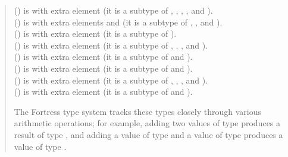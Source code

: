 \begin{description}
\begin{quote}
\begin{tabbing}
 () is  with extra element \EXP{+\infty}
(it is a subtype of , , , , and ).
\\
 () is
 with extra elements \EXP{+\infty} and \EXP{-\infty}
(it is a subtype of , , and ).
\\
 () is  with extra element 
(it is a subtype of ).
\\
 () is  with extra element 
(it is a subtype of , , , and ).
\\
 () is  with extra element 
(it is a subtype of  and ).
\\
 () is  with extra element 
(it is a subtype of  and ).
\\
 () is  with extra element 
(it is a subtype of , ,
, and ).
\\
 () is  with extra element 
(it is a subtype of  and ).
\end{tabbing}

The Fortress type system tracks these types closely through various arithmetic
operations; for example, adding two values of type  produces a result of type ,
and adding a value of type  and a value of type  produces a value
of type .


\end{quote}
\end{description}
